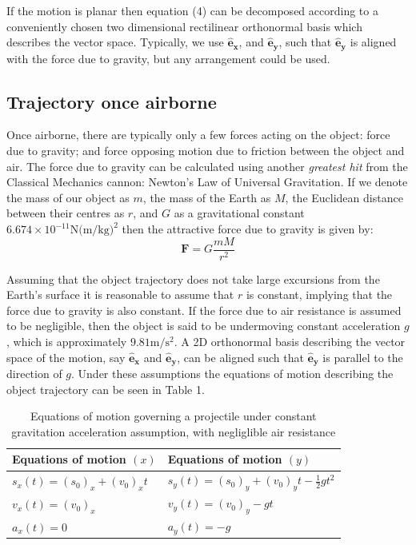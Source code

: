 \documentclass[a4paper]{article}
\begin{document}
If the motion is planar then equation (4) can be decomposed according to a conveniently chosen two dimensional rectilinear orthonormal basis which describes the vector space. Typically, we use $\boldsymbol{\hat{e}_x}$, and $\boldsymbol{\hat{e}_y}$, such that $\boldsymbol{\hat{e}_y}$ is aligned with the force due to gravity, but any arrangement could be used.

\subsection{Trajectory once airborne}
Once airborne, there are typically only a few forces acting on the object: force due to gravity; and force opposing motion due to friction between the object and air. The force due to gravity can be calculated using another \textit{greatest hit} from the Classical Mechanics cannon: Newton's Law of Universal Gravitation. If we denote the mass of our object as $m$, the mass of the Earth as $M$, the Euclidean distance between their centres as $r$, and $G$ as a gravitational constant $6.674×10^{−11} \si{\newton(\meter\per\kilogram)^2}$ then the attractive force due to gravity is given by:
\begin{equation}
\boldsymbol{F} = G \frac{m M}{r^2}
\end{equation}

Assuming that the object trajectory does not take large excursions from the Earth's surface it is reasonable to assume that $r$ is constant, implying that the force due to gravity is also constant. If the force due to air resistance is assumed to be negligible, then the object is said to be undermoving constant acceleration $g$, which is approximately $9.81\si{\meter\per\second^2}$. A 2D orthonormal basis describing the vector space of the motion, say $\boldsymbol{\hat{e}_x}$ and $\boldsymbol{\hat{e}_y}$, can be aligned such that $\boldsymbol{\hat{e}_y}$ is parallel to the direction of $g$. Under these assumptions the equations of motion describing the object trajectory can be seen in Table 1.
\begin{table}[h]
	\centering
	\caption{Equations of motion governing a projectile under constant gravitation acceleration assumption, with negliglible air resistance}
	\begin{tabular}{ll}
		\toprule
		Equations of motion $(x)$ & Equations of motion $(y)$\\
		\midrule
		$s_x(t) = (s_0)_x + (v_0)_x t$ & $s_y(t) = (s_0)_y + (v_0)_y t -\frac{1}{2}gt^2 $ \\
		$v_x(t) = (v_0)_x$ & $v_y(t) = (v_0)_y - gt$ \\
		$a_x(t) = 0$ & $a_y(t) = -g$ \\
		\bottomrule
	\end{tabular}
\end{table}
\end{document}
